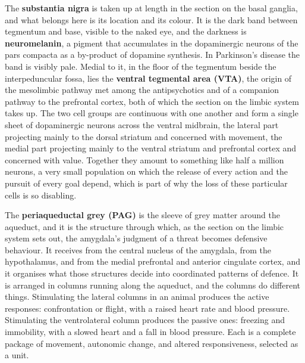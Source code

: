\documentclass[11pt]{article}
\begin{document}
The \textbf{substantia nigra} is taken up at length in the section on the basal ganglia, and what belongs here is its location and its colour. It is the dark band between tegmentum and base, visible to the naked eye, and the darkness is \textbf{neuromelanin}, a pigment that accumulates in the dopaminergic neurons of the pars compacta as a by-product of dopamine synthesis. In Parkinson's disease the band is visibly pale. Medial to it, in the floor of the tegmentum beside the interpeduncular fossa, lies the \textbf{ventral tegmental area (VTA)}, the origin of the mesolimbic pathway met among the antipsychotics and of a companion pathway to the prefrontal cortex, both of which the section on the limbic system takes up. The two cell groups are continuous with one another and form a single sheet of dopaminergic neurons across the ventral midbrain, the lateral part projecting mainly to the dorsal striatum and concerned with movement, the medial part projecting mainly to the ventral striatum and prefrontal cortex and concerned with value. Together they amount to something like half a million neurons, a very small population on which the release of every action and the pursuit of every goal depend, which is part of why the loss of these particular cells is so disabling.

The \textbf{periaqueductal grey (PAG)} is the sleeve of grey matter around the aqueduct, and it is the structure through which, as the section on the limbic system sets out, the amygdala's judgment of a threat becomes defensive behaviour. It receives from the central nucleus of the amygdala, from the hypothalamus, and from the medial prefrontal and anterior cingulate cortex, and it organises what those structures decide into coordinated patterns of defence. It is arranged in columns running along the aqueduct, and the columns do different things. Stimulating the lateral columns in an animal produces the active responses: confrontation or flight, with a raised heart rate and blood pressure. Stimulating the ventrolateral column produces the passive ones: freezing and immobility, with a slowed heart and a fall in blood pressure. Each is a complete package of movement, autonomic change, and altered responsiveness, selected as a unit.
\end{document}
